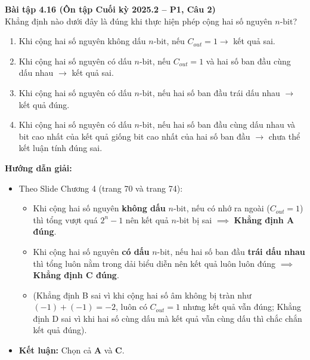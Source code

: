 \textbf{Bài tập 4.16 (Ôn tập Cuối kỳ 2025.2 -- P1, Câu 2)}\\
Khẳng định nào dưới đây là đúng khi thực hiện phép cộng hai số nguyên $n\text{-bit}$?
\begin{enumerate}[label=\Alph*.]
    \item Khi cộng hai số nguyên không dấu $n\text{-bit}$, nếu $C_{out} = 1 \rightarrow$ kết quả sai.
    \item Khi cộng hai số nguyên có dấu $n\text{-bit}$, nếu $C_{out} = 1$ và hai số ban đầu cùng dấu nhau $\rightarrow$ kết quả sai.
    \item Khi cộng hai số nguyên có dấu $n\text{-bit}$, nếu hai số ban đầu trái dấu nhau $\rightarrow$ kết quả đúng.
    \item Khi cộng hai số nguyên có dấu $n\text{-bit}$, nếu hai số ban đầu cùng dấu nhau và bit cao nhất của kết quả giống bit cao nhất của hai số ban đầu $\rightarrow$ chưa thể kết luận tính đúng sai.
\end{enumerate}
\textbf{Hướng dẫn giải:}
\begin{itemize}
    \item Theo Slide Chương 4 (trang 70 và trang 74):
    \begin{itemize}
        \item Khi cộng hai số nguyên \textbf{không dấu} $n\text{-bit}$, nếu có nhớ ra ngoài ($C_{out} = 1$) thì tổng vượt quá $2^n - 1$ nên kết quả $n\text{-bit}$ bị sai $\implies$ \textbf{Khẳng định A đúng}.
        \item Khi cộng hai số nguyên \textbf{có dấu} $n\text{-bit}$, nếu hai số ban đầu \textbf{trái dấu nhau} thì tổng luôn nằm trong dải biểu diễn nên kết quả luôn luôn đúng $\implies$ \textbf{Khẳng định C đúng}.
        \item (Khẳng định B sai vì khi cộng hai số âm không bị tràn như $(-1) + (-1) = -2$, luôn có $C_{out} = 1$ nhưng kết quả vẫn đúng; Khẳng định D sai vì khi hai số cùng dấu mà kết quả vẫn cùng dấu thì chắc chắn kết quả đúng).
    \end{itemize}
    \item \textbf{Kết luận:} Chọn cả \textbf{A} và \textbf{C}.
\end{itemize}

